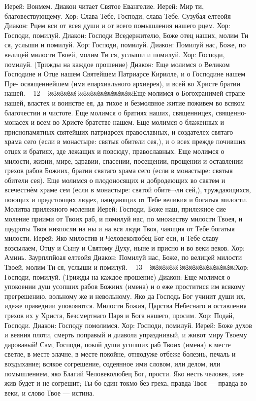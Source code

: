 Иерей: Вонмем.
Диакон читает Святое Евангелие.
Иерей: Мир ти, благовествующему. Хор: Слава Тебе, Господи, слава Тебе.
Сузубая елтеойя
Диакон: Рцем вси от всея души и от всего помышления нашего рцем.
Хор: Господи, помилуй.
Диакон: Господи Вседержителю, Боже отец наших, молим Ти ся, услыши и помилуй.
Хор: Господи, помилуй.
Диакон: Помилуй нас, Боже, по велицей милости Твоей, молим Ти ся, услыши и помилуй.
Хор: Господи, помилуй. (Трижды на каждое прошение) Диакон: Еще молимся о Великом Господине и Отце нашем Святейшем Патриарсе Кирилле, и о Господине нашем Пре- освященнейшем (имя епархиального архиерея), и всей во Христе братии нашей.
~ 12 ~
￼￼￼￼
￼￼￼￼￼￼￼￼Еще молимся о Богохранимей стране нашей, властех и воинстве ея, да тихое и безмолвное житие поживем во всяком благочестии и чистоте.
Еще молимся о братиях наших, священницех, священно- монасех и всем во Христе братстве нашем.
Еще молимся о блаженных и приснопамятных святейших патриарсех православных, и создателех святаго храма сего (если в монастыре: святыя обители сея,), и о всех прежде почивших отцех и братиях, зде лежащих и повсюду, православных.
Еще молимся о милости, жизни, мире, здравии, спасении, посещении, прощении и оставлении грехов рабов Божиих, братии святаго храма сего (если в монастыре: святыя обители сея). Еще молимся о плодоносящих и добродеющих во святем и всечестнѐм храме сем (если в монастыре: святой обите¬ли сей,), труждающихся, поющих и предстоящих людех, ожидающих от Тебе великия и богатыя милости.
Молитва прилежного моления
Иерей: Господи, Боже наш, прилежное сие моление приими от Твоих раб, и помилуй нас, по множеству милости Твоея, и щедроты Твоя низпосли на ны и на вся люди Твоя, чающия от Тебе богатыя милости.
Иерей: Яко милостив и Человеколюбец Бог еси, и Тебе славу возсылаем, Отцу и Сыну и Святому Духу, ныне и присно и во веки веков.
Хор: Аминь.
Заурплпйоая елтеойя
Диакон: Помилуй нас, Боже, по велицей милости Твоей, молим Ти ся, услыши и помилуй.
~ 13 ~
￼￼￼￼
￼￼￼￼￼￼￼￼Хор: Господи, помилуй. (Трижды на каждое прошение) Диакон: Еще молимся о упокоении душ усопших рабов Божиих (имена) и о еже проститися им всякому прегрешению, вольному же и невольному.
Яко да Господь Бог учинит души их, идеже праведнии упокояются.
Милости Божия, Царства Небеснаго и оставления грехов их у Христа, Безсмертнаго Царя и Бога нашего, просим.
Хор: Подай, Господи. Диакон: Господу помолимся. Хор: Господи, помилуй.
Иерей: Боже духов и веяния плоти, смерть поправый и диавола упразднивый, и живот миру Твоему даровавый! Сам, Господи, покой души усопших раб Твоих (имена) в месте светле, в месте злачне, в месте покойне, отнюдуже отбеже болезнь, печаль и воздыхание; всякое согрешение, содеянное ими словом, или делом, или помышлением, яко Благий Человеколюбец Бог, прости. Яко несть человек, иже жив будет и не согрешит; Ты бо един токмо без греха, правда Твоя — правда во веки, и слово Твое — истина.
